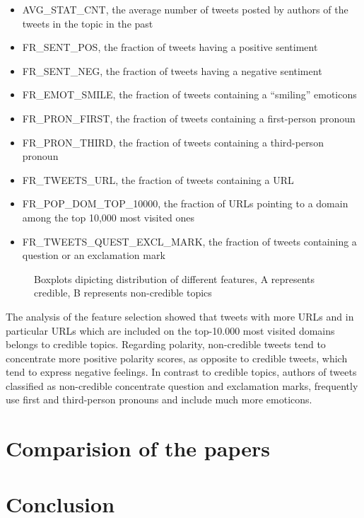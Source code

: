 \documentclass{proseminar}
\begin{document}
\begin{itemize}
\item AVG\_STAT\_CNT, the average number of tweets posted by authors of the tweets in the topic in the past
\item FR\_SENT\_POS, the fraction of tweets having a positive sentiment
\item FR\_SENT\_NEG, the fraction of tweets having a negative sentiment
\item FR\_EMOT\_SMILE, the fraction of tweets containing a “smiling” emoticons
\item FR\_PRON\_FIRST, the fraction of tweets containing a first-person pronoun
\item FR\_PRON\_THIRD, the fraction of tweets containing a third-person pronoun
\item FR\_TWEETS\_URL, the fraction of tweets containing a URL
\item FR\_POP\_DOM\_TOP\_10000, the fraction of URLs pointing to a domain among the top 10,000 most visited ones
\item FR\_TWEETS\_QUEST\_EXCL\_MARK, the fraction of tweets containing a question or an exclamation mark
\end{itemize}


\begin{figure}[h]
\centering
{}
\caption{Boxplots dipicting distribution of different features, A represents credible, B represents non-credible topics}
\label{fig:boxCredibility}
\end{figure}

The analysis of the feature selection showed that tweets with more URLs and in particular URLs which are included on the top-10.000 most visited domains belongs to credible topics. 
Regarding polarity, non-credible tweets tend to concentrate more positive polarity scores, as opposite to credible tweets, which tend to express negative feelings.
In contrast to credible topics, authors of tweets classified as non-credible concentrate question and exclamation marks, frequently use first and third-person pronouns and include much more emoticons.



\section{Comparision of the papers}



\section{Conclusion}




 

\balancecolumns
\end{document}
